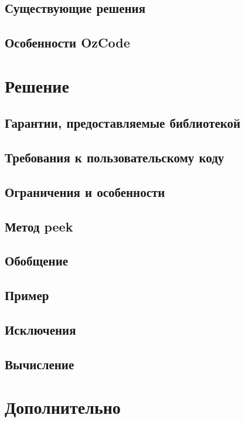 \subsection{Существующие решения}

\subsection{Особенности OzCode}


\section{Решение}
\subsection{Гарантии, предоставляемые библиотекой}

\subsection{Требования к пользовательскому коду}

\subsection{Ограничения и особенности}

\subsection{Метод peek}


\subsection{Обобщение}

\subsection{Пример}

\subsection{Исключения}

\subsection{Вычисление}



\section{Дополнительно}

